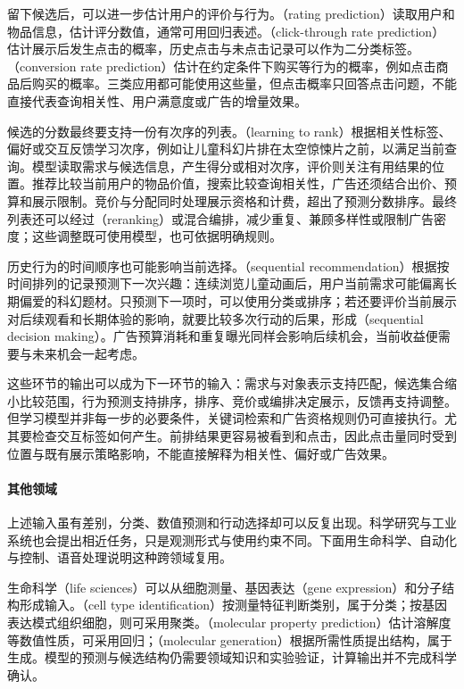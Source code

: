 留下候选后，可以进一步估计用户的评价与行为。（rating prediction）读取用户和物品信息，估计评分数值，通常可用回归表述。（click-through rate prediction）估计展示后发生点击的概率，历史点击与未点击记录可以作为二分类标签。（conversion rate prediction）估计在约定条件下购买等行为的概率，例如点击商品后购买的概率。三类应用都可能使用这些量，但点击概率只回答点击问题，不能直接代表查询相关性、用户满意度或广告的增量效果。

候选的分数最终要支持一份有次序的列表。（learning to rank）根据相关性标签、偏好或交互反馈学习次序，例如让儿童科幻片排在太空惊悚片之前，以满足当前查询。模型读取需求与候选信息，产生得分或相对次序，评价则关注有用结果的位置。推荐比较当前用户的物品价值，搜索比较查询相关性，广告还须结合出价、预算和展示限制。竞价与分配同时处理展示资格和计费，超出了预测分数排序。最终列表还可以经过（reranking）或混合编排，减少重复、兼顾多样性或限制广告密度；这些调整既可使用模型，也可依据明确规则。

历史行为的时间顺序也可能影响当前选择。（sequential recommendation）根据按时间排列的记录预测下一次兴趣：连续浏览儿童动画后，用户当前需求可能偏离长期偏爱的科幻题材。只预测下一项时，可以使用分类或排序；若还要评价当前展示对后续观看和长期体验的影响，就要比较多次行动的后果，形成（sequential decision making）。广告预算消耗和重复曝光同样会影响后续机会，当前收益便需要与未来机会一起考虑。

这些环节的输出可以成为下一环节的输入：需求与对象表示支持匹配，候选集合缩小比较范围，行为预测支持排序，排序、竞价或编排决定展示，反馈再支持调整。但学习模型并非每一步的必要条件，关键词检索和广告资格规则仍可直接执行。尤其要检查交互标签如何产生。前排结果更容易被看到和点击，因此点击量同时受到位置与既有展示策略影响，不能直接解释为相关性、偏好或广告效果。

\paragraph{其他领域}
上述输入虽有差别，分类、数值预测和行动选择却可以反复出现。科学研究与工业系统也会提出相近任务，只是观测形式与使用约束不同。下面用生命科学、自动化与控制、语音处理说明这种跨领域复用。

生命科学（life sciences）可以从细胞测量、基因表达（gene expression）和分子结构形成输入。（cell type identification）按测量特征判断类别，属于分类；按基因表达模式组织细胞，则可采用聚类。（molecular property prediction）估计溶解度等数值性质，可采用回归；（molecular generation）根据所需性质提出结构，属于生成。模型的预测与候选结构仍需要领域知识和实验验证，计算输出并不完成科学确认。

